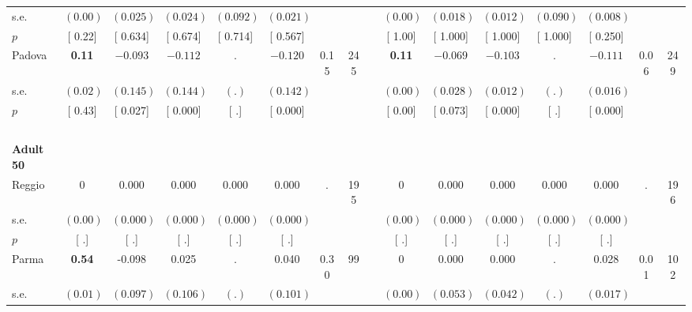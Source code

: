 \begin{longtable}{L{8em} c c c c c c c p{1em} c c c c c c c}
\quad \quad \quad \quad s.e.& $ (     0.00)$ & $ (    0.025)$ & $ (    0.024)$ & $ (    0.092)$ & $ (    0.021)$ & & & & $ (     0.00)$ & $ (    0.018)$ & $ (    0.012)$ & $ (    0.090)$ & $ (    0.008)$ & &  \\*
\quad \quad \quad \quad $ p$ & [     0.22] & [    0.634] & [    0.674] & [    0.714] & [    0.567] & & & & [     1.00] & [    1.000] & [    1.000] & [    1.000] & [    0.250] & &  \\[1em]
\quad \quad \quad Padova& \textbf{     0.11} & $ \mathbf{   -0.093}$ & $ \mathbf{   -0.112}$ &         . & $ \mathbf{   -0.120}$ &      0.15 &       245 & & \textbf{     0.11} & $ \mathbf{   -0.069}$ & $ \mathbf{   -0.103}$ &         . & $ \mathbf{   -0.111}$ &      0.06 &       249  \\*
\quad \quad \quad \quad s.e.& $ (     0.02)$ & $ (    0.145)$ & $ (    0.144)$ & $ (        .)$ & $ (    0.142)$ & & & & $ (     0.00)$ & $ (    0.028)$ & $ (    0.012)$ & $ (        .)$ & $ (    0.016)$ & &  \\*
\quad \quad \quad \quad $ p$ & [     0.43] & [    0.027] & [    0.000] & [        .] & [    0.000] & & & & [     0.00] & [    0.073] & [    0.000] & [        .] & [    0.000] & &  \\[1em]
~\\[1em]
\quad \quad \textbf{Adult 50} & & & & & & & & & & & & & & & \\* 
\quad \quad \quad Reggio& 0 &     0.000 &     0.000 &     0.000 &     0.000 &         . &       195 & & 0 &     0.000 &     0.000 &     0.000 &     0.000 &         . &       196  \\*
\quad \quad \quad \quad s.e.& $ (     0.00)$ & $ (    0.000)$ & $ (    0.000)$ & $ (    0.000)$ & $ (    0.000)$ & & & & $ (     0.00)$ & $ (    0.000)$ & $ (    0.000)$ & $ (    0.000)$ & $ (    0.000)$ & &  \\*
\quad \quad \quad \quad $ p$ & [        .] & [        .] & [        .] & [        .] & [        .] & & & & [        .] & [        .] & [        .] & [        .] & [        .] & &  \\[1em]
\quad \quad \quad Parma& \textbf{     0.54} &    -0.098 &     0.025 &         . &     0.040 &      0.30 &        99 & & 0 &     0.000 &     0.000 &         . &     0.028 &      0.01 &       102  \\*
\quad \quad \quad \quad s.e.& $ (     0.01)$ & $ (    0.097)$ & $ (    0.106)$ & $ (        .)$ & $ (    0.101)$ & & & & $ (     0.00)$ & $ (    0.053)$ & $ (    0.042)$ & $ (        .)$ & $ (    0.017)$ & &  \\*

\end{longtable}
